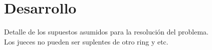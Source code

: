 \section{Desarrollo}

Detalle de los supuestos asumidos para la resolución del problema.\\

Los jueces no pueden ser suplentes de otro ring y etc.
